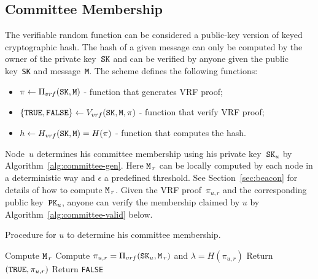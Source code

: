 \documentclass{article}
\begin{document}
\subsection{Committee Membership}
\label{sec:committee}
The verifiable random function can be considered a public-key version of keyed cryptographic hash. The hash of a given message can only be computed by the owner of the private key~${\tt SK}$ and can be verified by anyone given the public key~{\tt SK} and message~{\tt M}. The scheme defines the following functions:
\begin{itemize}
    \item $\pi\leftarrow\Pi_{vrf}({\tt SK},{\tt M})$ - function that generates VRF proof;
    \item $\{{\tt TRUE}, {\tt FALSE}\}\leftarrow V_{vrf}({\tt SK},{\tt M},\pi)$ - function that verify VRF proof;
    \item $h\leftarrow H_{vrf}({\tt SK},{\tt M})=H(\pi)$ - function that computes the hash.
\end{itemize}

Node~$u$ determines his committee membership using his private key~${\tt SK}_u$ by Algorithm~\ref{alg:committee-gen}. Here ${\tt M}_{\,r}$ can be locally computed by each node in a deterministic way and $\epsilon$ a predefined threshold. See Section~\ref{sec:beacon} for details of how to compute ${\tt M}_{\,r}$. Given the VRF proof~$\pi_{u,r}$ and the corresponding public key~${\tt PK}_u$, anyone can verify the membership claimed by $u$ by Algorithm~\ref{alg:committee-valid} below.

\begin{algorithm}[H]
\caption{Procedure for $u$ to determine his committee membership. }
\label{alg:committee-gen}
\begin{spacing}{1.2}
\begin{algorithmic}[1]
    \vspace{1ex}
    \State Compute ${\tt M}_{\,r}$
    \State Compute $\pi_{u,r} = \Pi_{vrf}({\tt SK}_u,{\tt M}_{\,r})$ and $\lambda=H\left(\pi_{u,r}\right)$
    \vspace{1ex}
    \If{$\lambda\leq\epsilon$}
        \State Return $\left({\tt TRUE},\pi_{u,r}\right)$
    \Else 
        \State Return {\tt FALSE}
    \EndIf
\end{algorithmic}
\end{spacing}
\end{algorithm}
\end{document}
